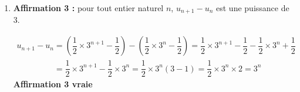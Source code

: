 \begin{enumerate}
Pour $n=0$, on a $u_0=0$ et $\dfrac{1}{2} \times 3^{0}-\dfrac{1}{2} = \dfrac{1}{2}-\dfrac{1}{2}=0$.

Pour $n=1$, on a $u_1=1$ et $\dfrac{1}{2} \times 3^{1}-\dfrac{1}{2} = \dfrac{3}{2}-\dfrac{1}{2}=1$.

Pour $n=2$, on a $u_2=4$ et $\dfrac{1}{2} \times 3^{2}-\dfrac{1}{2} = \dfrac{9}{2}-\dfrac{1}{2}=4$.

On conjecture que la propriété \og{} $u_{n} = \dfrac{1}{2} \times 3^{n}-\dfrac{1}{2}$\fg{} est vraie pour tout $n$, et on va démontrer cette conjecture en utilisant un raisonnement par récurrence.


\hfill \textbf{Affirmation 2 vraie}

\item \textbf{Affirmation 3 :} \og{} pour tout entier naturel $n$, \quad $u_{n + 1}-u_{n}$ est une puissance de 3.\fg{}

$\begin{gathered}u_{n+1}-u_n = \left (\dfrac{1}{2}\times 3^{n+1} -\dfrac{1}{2}\right ) - \left ( \dfrac{1}{2}\times 3^{n} -\dfrac{1}{2}\right )
= \dfrac{1}{2}\times 3^{n+1} -\dfrac{1}{2} - \dfrac{1}{2}\times 3^{n} +\dfrac{1}{2}\\
\phantom{u_{n+1}-u_n}
= \dfrac{1}{2}\times 3^{n+1} - \dfrac{1}{2}\times 3^{n}
= \dfrac{1}{2}\times 3^n\left (3-1\right )
= \dfrac{1}{2}\times 3^n \times 2
= 3^n\end{gathered}$
\hfill \textbf{Affirmation 3 vraie}
\end{enumerate}
